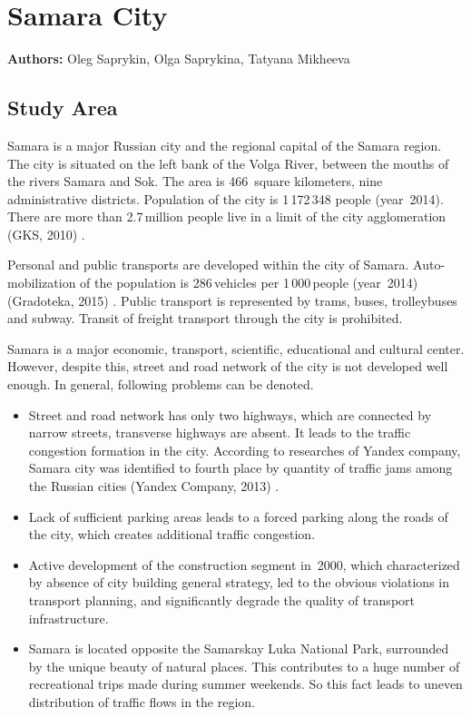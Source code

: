 \chapter{Samara City}
\label{ch:samara}
\hfill \textbf{Authors:} Oleg Saprykin, Olga Saprykina, Tatyana Mikheeva

\section{Study Area}
Samara is a major Russian city and the regional capital of the Samara region. The city is situated on the left bank of the Volga River, between the mouths of the rivers Samara and Sok. The area is 466\, square kilometers, nine administrative districts. Population of the city is 1\,172\,348 people (year~2014). There are more than 2.7\,million people live in a limit of the city agglomeration (GKS, 2010) \citep[][]{}.

Personal and public transports are developed within the city of Samara. Auto-mobilization of the population is 286\,vehicles per 1\,000\,people (year~2014) (Gradoteka, 2015) \citep[][]{}. Public transport is represented by trams, buses, trolleybuses and subway. Transit of freight transport through the city is prohibited.

Samara is a major economic, transport, scientific, educational and cultural center. However, despite this, street and road network of the city is not developed well enough. In general, following problems can be denoted.

\begin{itemize}
\item Street and road network has only two highways, which are connected by narrow streets, transverse highways are absent. It leads to the traffic congestion formation in the city. According to researches of Yandex company, Samara city was identified to fourth place by quantity of traffic jams among the Russian cities (Yandex Company, 2013) \citep[][]{}.
\item Lack of sufficient parking areas leads to a forced parking along the roads of the city, which creates additional traffic congestion.
\item Active development of the construction segment in~2000, which characterized by absence of city building general strategy, led to the obvious violations in transport planning, and significantly degrade the quality of transport infrastructure.
\item Samara is located opposite the Samarskay Luka National Park, surrounded by the unique beauty of natural places. This contributes to a huge number of recreational trips made during summer weekends. So this fact leads to uneven distribution of traffic flows in the region.
\end{itemize}

